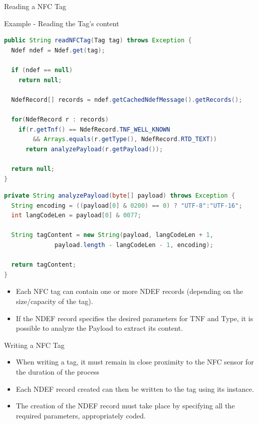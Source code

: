 \documentclass{beamer}
\begin{document}
  \begin{frame}{Reading a NFC Tag}
    \begin{exampleblock}{Example - Reading the Tag's content}
      \begin{lstlisting}[language=Java]	
public String readNFCTag(Tag tag) throws Exception {
  Ndef ndef = Ndef.get(tag);

  if (ndef == null)
    return null;

  NdefRecord[] records = ndef.getCachedNdefMessage().getRecords();

  for(NdefRecord r : records)      	
    if(r.getTnf() == NdefRecord.TNF_WELL_KNOWN 
        && Arrays.equals(r.getType(), NdefRecord.RTD_TEXT))
      return analyzePayload(r.getPayload());

  return null;
}
      \end{lstlisting}
    \end{exampleblock}

    \begin{exampleblock}{\vspace{-10pt}}
      \begin{lstlisting}[language=Java]
private String analyzePayload(byte[] payload) throws Exception {
  String encoding = ((payload[0] & 0200) == 0) ? "UTF-8":"UTF-16";
  int langCodeLen = payload[0] & 0077;
  
  String tagContent = new String(payload, langCodeLen + 1,
              payload.length - langCodeLen - 1, encoding);
                              
  return tagContent;
}
      \end{lstlisting}
    \end{exampleblock}
    \begin{itemize}
      \item Each NFC tag can contain one or more NDEF records (depending on the
      size/capacity of the tag).
      \item If the NDEF record specifies the desired parameters for TNF and
      Type, it is possible to analyze the Payload to extract its content.
    \end{itemize}
  \end{frame}

  \begin{frame}{Writing a NFC Tag}
    \begin{itemize}\itemsep10pt
      \item When writing a tag, it must remain in close proximity to the
      NFC sensor for the duration of the process 
      \item Each NDEF record created can then be written to the tag using its
      instance.
      \item The creation of the NDEF record must take place by specifying all
      the required parameters, appropriately coded.
    \end{itemize}

  \end{frame}
    
\end{document}
